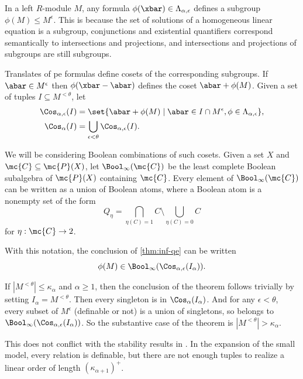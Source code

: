 \documentclass[11pt]{article}
\begin{document}
In a left $R$-module $M$, any formula $\phi(\xbar) \in \Lambda_{\alpha,\epsilon}$ defines a subgroup $\phi(M) \leq M^\epsilon$. This is because the set of solutions of a homogeneous linear equation is a subgroup, conjunctions and existential quantifiers correspond semantically to intersections and projections, and intersections and projections of subgroups are still subgroups. 

Translates of pe formulas define cosets of the corresponding subgroups. If $\abar \in M^\epsilon$ then $\phi(\xbar - \abar)$ defines the coset $\abar + \phi(M)$. Given a set of tuples $I \subseteq M^{<\theta}$, let
\begin{align*}
    \Cos_{\alpha,\epsilon}(I) &= \set{ \abar + \phi(M) \mid \abar \in I \cap M^\epsilon, \phi \in \Lambda_{\alpha,\epsilon} }, \\
    \Cos_\alpha(I) &= \bigcup_{\epsilon < \theta} \Cos_{\alpha,\epsilon}(I).
\end{align*}

We will be considering Boolean combinations of such cosets. Given a set $X$ and $\mc{C} \subseteq \mc{P}(X)$, let $\Bool_\infty(\mc{C})$ be the least complete Boolean subalgebra of $\mc{P}(X)$ containing $\mc{C}$. 
Every element of $\Bool_\infty(\mc{C})$ can be written as a union of Boolean atoms, where a Boolean atom is a nonempty set of the form 
\[ 
    Q_\eta = \bigcap_{\eta(C) = 1} C \setminus \bigcup_{\eta(C) = 0} C
\]
for $\eta: \mc{C} \to 2$. 

With this notation, the conclusion of \cref{thm:inf-qe} can be written
\[
    \phi(M) \in \Bool_\infty(\Cos_{\alpha,\epsilon}(I_\alpha)).
\]

\begin{remark}
    If $|M^{<\theta}| \leq \kappa_\alpha$ and $\alpha \geq 1$, then the conclusion of the theorem follows trivially by setting $I_\alpha = M^{<\theta}$. Then every singleton is in $\Cos_\alpha(I_\alpha)$. And for any $\epsilon < \theta$, every subset of $M^\epsilon$ (definable or not) is a union of singletons, so belongs to $\Bool_\infty( \Cos_{\alpha,\epsilon}(I_\alpha))$. So the substantive case of the theorem is $|M^{<\theta}| > \kappa_\alpha$.

    This does not conflict with the stability results in \cite{Shelah2012}. In the expansion of the small model, every relation is definable, but there are not enough tuples to realize a linear order of length $(\kappa_{\alpha+1})^+$.
\end{remark}
\end{document}

